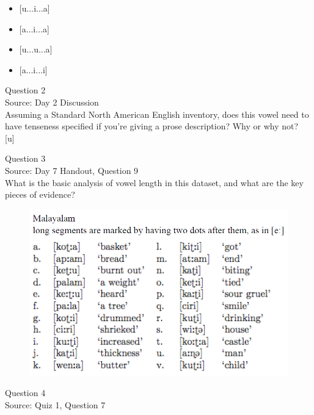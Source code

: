 \documentclass[12pt]{article}
\begin{document}
\begin{itemize} \item {[u...i...a]} \item {[a...i...a]} \item {[u...u...a]} \item {[a...i...i]} \end{itemize}


\newpage

{\large Question 2}\\

Source: Day 2 Discussion\\

Assuming a Standard North American English inventory, does this vowel need to have tenseness specified if you're giving a prose description? Why or why not?\\

{[u]}


\newpage

{\large Question 3}\\

Source: Day 7 Handout, Question 9\\

What is the basic analysis of vowel length in this dataset, and what are the key pieces of evidence?\\

\begin{figure}[H]
\includegraphics{../images/malayalam.png}
\end{figure}

\newpage

{\large Question 4}\\

Source: Quiz 1, Question 7\\
\end{document}
